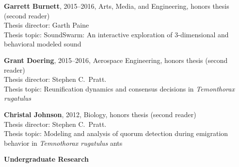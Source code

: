 \documentclass[10pt]{article}
\newcommand{\blankline}{\quad\pagebreak[3]}
\begin{document}
\begin{outerlist}
    \item \textbf{Garrett Burnett}, 2015--2016, Arts, Media, and Engineering, honors thesis (second reader)\\
        Thesis director: Garth Paine\\
        Thesis topic: SoundSwarm: An interactive exploration of
        3-dimensional and behavioral modeled sound

    \item \textbf{Grant Doering}, 2015--2016, Aerospace Engineering, honors thesis (second reader)\\
        Thesis director: Stephen C.~Pratt.\\
        Thesis topic: Reunification dynamics and consensus decisions in \emph{Temonthorax rugatulus}

    \item \textbf{Christal Johnson}, 2012, Biology, honors thesis (second reader)\\
        Thesis director: Stephen C.~Pratt.\\
        Thesis topic: Modeling and analysis of quorum detection during
        emigration behavior in \emph{Temnothorax rugatulus} ants

\end{outerlist}

\blankline

\textbf{Undergraduate Research}
\end{document}
